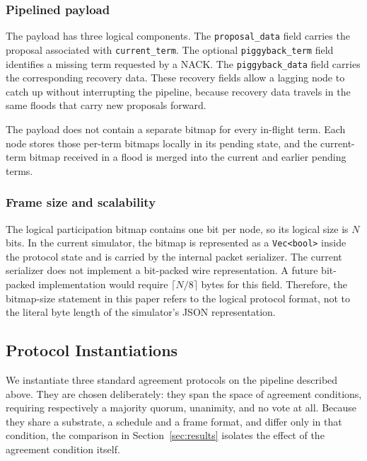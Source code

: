 \documentclass[journal]{IEEEtran}
\begin{document}
\subsubsection{Pipelined payload}
The payload has three logical components. The \texttt{proposal\_data} field
carries the proposal associated with \texttt{current\_term}. The optional
\texttt{piggyback\_term} field identifies a missing term requested by a
NACK. The \texttt{piggyback\_data} field carries the corresponding recovery
data. These recovery fields allow a lagging node to catch up without
interrupting the pipeline, because recovery data travels in the same floods
that carry new proposals forward.

The payload does not contain a separate bitmap for every in-flight term.
Each node stores those per-term bitmaps locally in its pending state, and
the current-term bitmap received in a flood is merged into the current and
earlier pending terms.

\subsubsection{Frame size and scalability}
The logical participation bitmap contains one bit per node, so its logical
size is $N$ bits. In the current simulator, the bitmap is represented as a
\texttt{Vec<bool>} inside the protocol state and is carried by the internal
packet serializer. The current serializer does not implement a bit-packed
wire representation. A future bit-packed implementation would require
$\lceil N/8\rceil$ bytes for this field. Therefore, the bitmap-size
statement in this paper refers to the logical protocol format, not to the
literal byte length of the simulator's JSON representation.

\subsection{Protocol Instantiations}
\label{sec:design-protocols}
We instantiate three standard agreement protocols on the pipeline
described above. They are chosen deliberately: they span the space of
agreement conditions, requiring respectively a majority quorum, unanimity,
and no vote at all. Because they share a substrate, a schedule and a frame
format, and differ only in that condition, the comparison in
Section~\ref{sec:results} isolates the effect of the agreement condition
itself.

\end{document}

